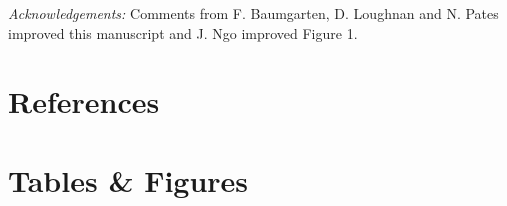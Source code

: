 \documentclass[11pt]{article}
\begin{document}
\emph{Acknowledgements:} Comments from F. Baumgarten, D. Loughnan and N. Pates improved this manuscript and J. Ngo improved Figure 1. 

\newpage
\section{References}
\vspace{-5ex}


\clearpage

\section{Tables \& Figures}
\end{document}
